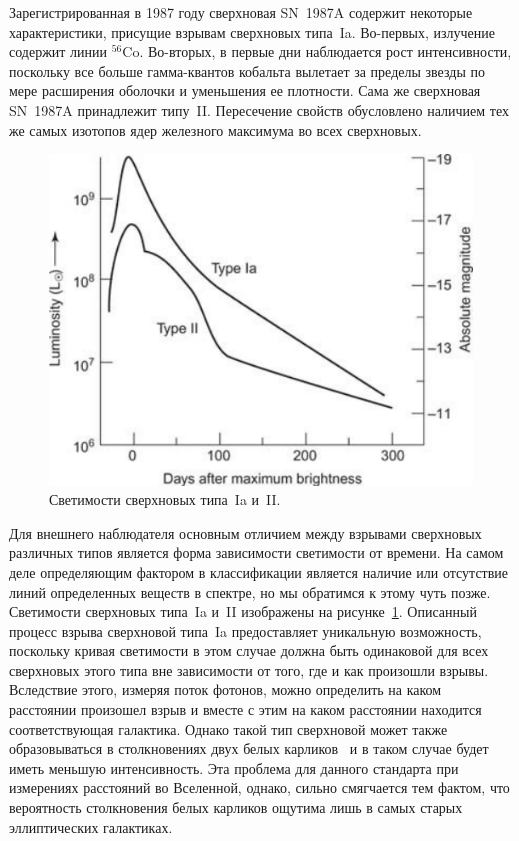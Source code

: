\documentclass[a4paper, 14pt]{extarticle}
\begin{document}
Зарегистрированная в 1987 году сверхновая SN~1987A содержит некоторые 
характеристики, присущие взрывам сверхновых типа~Ia. Во-первых, 
излучение содержит линии $^{56}$Co. Во-вторых, в первые дни наблюдается 
рост интенсивности, поскольку все больше гамма-квантов кобальта вылетает 
за пределы звезды по мере расширения оболочки и уменьшения ее плотности. 
Сама же сверхновая SN~1987A принадлежит типу~II. Пересечение свойств 
обусловлено наличием тех же самых изотопов ядер железного максимума во 
всех сверхновых.

\begin{figure}[t!]%
	\centering
	\includegraphics[width=.6\linewidth]{figures/23429.jpg.pdf}
	\caption{Светимости сверхновых типа~Ia и~II.}
	\label{fig:lumi}
\end{figure}%

Для внешнего наблюдателя основным отличием между взрывами сверхновых 
различных типов является форма зависимости светимости от времени. На 
самом деле определяющим фактором в классификации является наличие или 
отсутствие линий определенных веществ в спектре, но мы обратимся к этому 
чуть позже. Светимости сверхновых типа~Ia и~II изображены на 
рисунке~\ref{fig:lumi}. Описанный процесс взрыва сверхновой типа~Ia 
предоставляет уникальную возможность, поскольку кривая светимости в этом 
случае должна быть одинаковой для всех сверхновых этого типа вне 
зависимости от того, где и как произошли взрывы. Вследствие этого, 
измеряя поток фотонов, можно определить на каком расстоянии произошел 
взрыв и вместе с этим на каком расстоянии находится соответствующая 
галактика. Однако такой тип сверхновой может также образовываться 
в столкновениях двух белых карликов~\cite{dwarf-collision} и в таком 
случае будет иметь меньшую интенсивность. Эта проблема для данного 
стандарта при измерениях расстояний во Вселенной, однако, сильно 
смягчается тем фактом, что вероятность столкновения белых карликов 
ощутима лишь в самых старых эллиптических галактиках.
\end{document}
